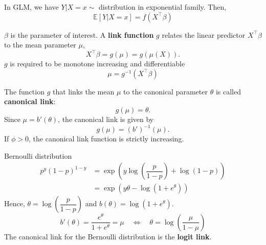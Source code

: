 \documentclass[a4paper, 10pt,landscape]{article}
\begin{document}
\begin{multicols*}{3}
\begin{description}
	\item In GLM, we have $Y|X=x\sim$ distribution in exponential family. Then,
	$$\mathbb{E}\left[Y|X=x\right]=f\left(X^\intercal\beta\right)$$
	\item[Link function] $\beta$ is the parameter of interest. A {\bf link function} $g$ relates the linear predictor $X^\intercal\beta$ to the mean parameter $\mu$,
	$$X^\intercal\beta=g(\mu)=g\left(\mu(X)\right).$$
	$g$ is required to be monotone increasing and differentiable
	$$\mu=g^{-1}\left(X^\intercal\beta\right)$$
	\item[Canonical Link] The function $g$ that links the mean $\mu$ to the canonical parameter $\theta$ is called {\bf canonical link}:
	$$g(\mu)=\theta.$$
	Since $\mu=b'(\theta)$, the canonical link is given by
	$$g(\mu)=(b')^{-1}(\mu).$$
	If $\phi>0$, the canonical link function is strictly increasing.
	\item[Example] Bernoulli distribution
	\begin{align*}
		p^y(1-p)^{1-y} & = \exp\left(y\log\left(\dfrac{p}{1-p}\right)+\log(1-p)\right)\\
		& = \exp\left(y\theta-\log(1+e^\theta)\right)
	\end{align*}
	Hence, $\theta=\log\left(\dfrac{p}{1-p}\right)$ and $b(\theta)=\log\left(1+e^\theta\right).$
	$$b'(\theta)=\dfrac{e^\theta}{1+e^\theta}=\mu\quad\iff\quad\theta=\log\left(\dfrac{\mu}{1-\mu}\right)$$
	The canonical link for the Bernoulli distribution is the {\bf logit link}.
\end{description}


\end{multicols*}
\end{document}
